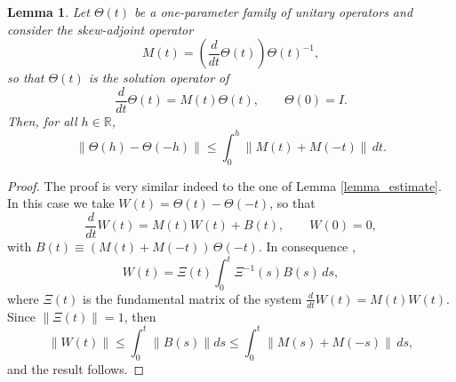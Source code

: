 \documentclass[11pt]{article}
\newtheorem{lemma}{Lemma}[section]
\begin{document}
\begin{lemma}
\label{l:Theta_M(t)}
Let $\Theta(t)$ be a one-parameter family of unitary operators  and consider the skew-adjoint operator 
\begin{equation}
\label{eq:l:Theta_M(t)}
M(t) = 
\left(
\frac{d}{dt} \Theta(t)
\right)
\Theta(t)^{-1},
\end{equation}
so that $\Theta(t)$ is the solution operator of 
\begin{equation*}
\frac{d}{dt} \Theta(t) = M(t) \Theta(t), \qquad  \Theta(0)=I.
\end{equation*}
Then, for all $h \in \mathbb{R}$,
\begin{equation*}
\| \Theta(h) - \Theta(-h)\| \leq \int_0^h \| M(t) + M(-t)\|\, dt.
\end{equation*}
\end{lemma}
\begin{proof}
The proof is very similar indeed to the one of Lemma \ref{lemma_estimate}. In this case we take $W(t) = \Theta(t) - \Theta(-t)$, so that 
\[
  \frac{d }{dt} W(t) = M(t) W(t) + B(t), \qquad W(0) = 0,
\]
with $B(t) \equiv (M(t) + M(-t)) \, \Theta(-t)$. In consequence \cite{coddington55tod},
\[
    W(t) = \Xi(t) \int_0^t \Xi^{-1}(s) B(s) \, ds,
\]
where $\Xi(t)$ is the fundamental matrix of the system $\frac{d }{dt} W(t) = M(t) W(t)$. Since $\| \Xi(t)\| = 1$, then
\[
  \|W(t)\| \le \int_0^t \|B(s)\| ds \le \int_0^t \| M(s) + M(-s)\| \, ds,
\]  
and the result follows.
\end{proof}
\end{document}
